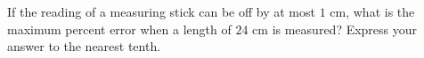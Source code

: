 If the reading of a measuring stick can be off by at most $1$ cm, what is the maximum percent error when a length of $24$ cm is measured? Express your answer to the nearest tenth.
